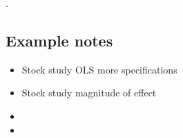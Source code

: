 \documentclass[../Main.tex]{subfiles}
\begin{document}
.

\subsection{Example notes}
\begin{itemize}
    \item Stock study OLS more specifications
    \item Stock study magnitude of effect
    \item 
    \item 
\end{itemize}

\biblio %
\end{document}
